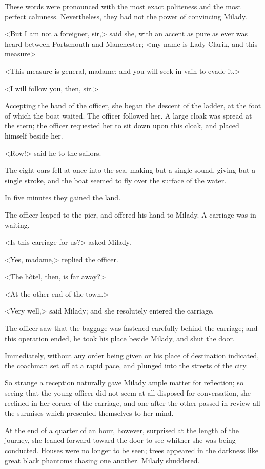 These words were pronounced with the most exact politeness and the most perfect calmness. Nevertheless, they had not the power of convincing Milady. 

<But I am not a foreigner, sir,> said she, with an accent as pure as ever was heard between Portsmouth and Manchester; <my name is Lady Clarik, and this measure\longdash> 

<This measure is general, madame; and you will seek in vain to evade it.> 

<I will follow you, then, sir.> 

Accepting the hand of the officer, she began the descent of the ladder, at the foot of which the boat waited. The officer followed her. A large cloak was spread at the stern; the officer requested her to sit down upon this cloak, and placed himself beside her. 

<Row!> said he to the sailors. 

The eight oars fell at once into the sea, making but a single sound, giving but a single stroke, and the boat seemed to fly over the surface of the water. 

In five minutes they gained the land. 

The officer leaped to the pier, and offered his hand to Milady. A carriage was in waiting. 

<Is this carriage for us?> asked Milady. 

<Yes, madame,> replied the officer. 

<The hôtel, then, is far away?> 

<At the other end of the town.> 

<Very well,> said Milady; and she resolutely entered the carriage. 

The officer saw that the baggage was fastened carefully behind the carriage; and this operation ended, he took his place beside Milady, and shut the door. 

Immediately, without any order being given or his place of destination indicated, the coachman set off at a rapid pace, and plunged into the streets of the city. 

So strange a reception naturally gave Milady ample matter for reflection; so seeing that the young officer did not seem at all disposed for conversation, she reclined in her corner of the carriage, and one after the other passed in review all the surmises which presented themselves to her mind. 

At the end of a quarter of an hour, however, surprised at the length of the journey, she leaned forward toward the door to see whither she was being conducted. Houses were no longer to be seen; trees appeared in the darkness like great black phantoms chasing one another. Milady shuddered. 

